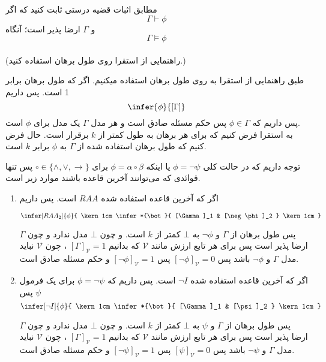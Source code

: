 	
	مطابق اثبات قضیه درستی ثابت کنید که اگر 
	$$\Gamma \vdash \phi$$
	و $\Gamma$ ارضا پذیر است؛ آنگاه
	$$\Gamma \vDash \phi$$\\
	(راهنمایی از استقرا روی طول برهان استفاده کنید.)
	
	\quad\vspace{0.5 cm}
	\begin {ans}
		طبق راهنمایی از استقرا به روی طول برهان استفاده میکنیم. 
		اگر که طول برهان برابر 1 است. پس داریم 
		$$
			\infer{\phi}{[\Gamma]}
		$$
		پس داریم که
		$\phi \in \Gamma$
	پس حکم مسئله صادق است و هر مدل
	 	$\Gamma$
	  یک مدل برای
	  	$\phi$
	    است.\\
		به استقرا فرض کنیم که برای هر برهان به طول کمتر از 
		$k$
		برقرار است. حال فرض کنیم که طول برهان استفاده شده از 
		$\Gamma$
		به 
		$\phi$
		برابر 
		$k$
		است. 
		
		
		توجه داریم که در حالت کلی
		$\phi = \neg \psi$
		یا اینکه 
		$\phi = \alpha \circ \beta$
		برای
		$\circ \in \{\wedge, \vee, \to\}$
		پس تنها قوائدی که می‌توانند آخرین قاعده باشند موارد زیر است.
		
		\quad\vspace {0.5 cm}
		\begin {enumerate}
			\item اگر که آخرین قاعده استفاده شده
			$RAA$ است. پس داریم 
			
			$$
				\infer[RAA_2]{\phi}{
					\kern 1cm	
					\infer*{\bot}{
						[\Gamma]_1
						&
						[\neg \phi]_2
					}
					\kern 1cm
				}
			$$
			
			پس طول برهان از 
			$\Gamma$ و $\neg \phi$
			به $\bot$ کمتر از $k$ است.
			و چون $\bot$ مدل ندارد و چون $\Gamma$ ارضا پذیر است پس برای هر تابع ارزش مانند $\mathcal {V}$ که بدانیم
			$[\Gamma]_\mathcal{V} = 1$ 
			، چون $\mathcal {V}$ نباید مدل $\Gamma$ و $\neg \phi$ باشد پس 
			$[\neg \phi]_\mathcal{V} = 0$
			پس 
			$[\neg \phi]_\mathcal{V} = 1$
			و حکم مسئله صادق است.
			
			
			
		\item 
		 اگر که آخرین قاعده استفاده شده
		$\neg I$ است. پس داریم 
		 که $\phi = \neg \psi$ 
		 برای یک فرمول
		  $\psi$
		   پس
		$$
		\infer[\neg I]{\phi}{
			\kern 1cm	
			\infer*{\bot}{
				[\Gamma]_1
				&
				[\psi]_2
			}
			\kern 1cm
		}
		$$
		
		پس طول برهان از 
		$\Gamma$ و $\psi$
		به $\bot$ کمتر از $k$ است.
		و چون $\bot$ مدل ندارد و چون $\Gamma$ ارضا پذیر است پس برای هر تابع ارزش مانند $\mathcal {V}$ که بدانیم
		$[\Gamma]_\mathcal{V} = 1$ 
		، چون $\mathcal {V}$ نباید مدل $\Gamma$ و $\neg \psi$ باشد پس 
		$[\psi]_\mathcal{V} = 0$
		پس 
		$[\neg \psi]_\mathcal{V} = 1$
		و حکم مسئله صادق است.
		

\end{enumerate}
\end{ans}
